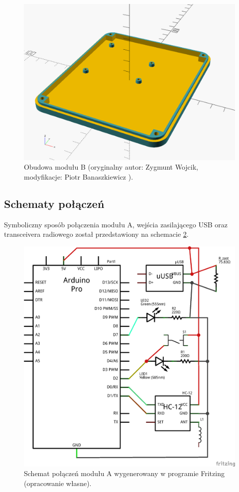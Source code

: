 \begin{figure}[H]
	\centering
	\includegraphics[scale=0.3]{pics/moduleB_case.png}
	\caption{\label{fig:moduleB_case}Obudowa modułu B (oryginalny autor: Zygmunt Wojcik, modyfikacje: Piotr Banaszkiewicz \cite{CasesLicense}).}
\end{figure}

\subsection{Schematy połączeń}
\label{subsec:schematy_polaczen}

Symboliczny sposób połączenia modułu A, wejścia zasilającego USB oraz transceivera radiowego został przedstawiony na schemacie \ref{fig:symbolic_schema_A}.

\begin{figure}[H]
	\centering
	\includegraphics[scale=0.4]{schemas/schema_moduleA_schem.png}
	\caption{\label{fig:symbolic_schema_A}Schemat połączeń modułu A wygenerowany w programie Fritzing \cite{Fritzing} (opracowanie własne).}
\end{figure}

